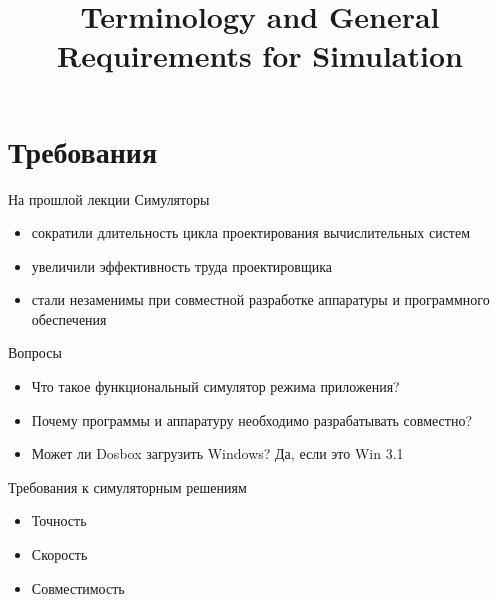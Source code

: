 

\title{Terminology and General Requirements for Simulation}



\begin{frame}
    \maketitle
\end{frame}

\begin{frame}
    \tableofcontents
\end{frame}

\section{Требования}

\begin{frame}{На прошлой лекции}
Симуляторы
\begin{itemize}
\item сократили длительность цикла проектирования вычислительных систем
\item увеличили эффективность труда проектировщика
\item стали незаменимы при совместной разработке аппаратуры и программного обеспечения
\end{itemize}
\end{frame}

\begin{frame}{Вопросы}
\begin{itemize}
\item Что такое функциональный симулятор режима приложения?\pause 
\item Почему программы и аппаратуру необходимо разрабатывать совместно?\pause
\item Может ли Dosbox загрузить Windows? \pause Да, если это Win 3.1
\end{itemize}
\end{frame}


\begin{frame}{Требования к симуляторным решениям}
\begin{itemize}
\item Точность
\item Скорость
\item Совместимость
\end{itemize}
\end{frame}

